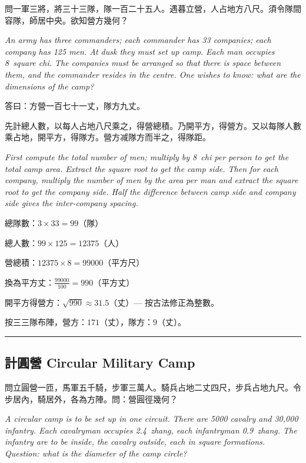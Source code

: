 \documentclass[11pt,a4paper]{article}
\newcommand{\longline}{\noindent\rule{\textwidth}{0.4pt}}
\begin{document}
\begin{problem}
問一軍三將，將三十三隊，隊一百二十五人。遇暮立營，人占地方八尺。須令隊間容隊，師居中央。欲知營方幾何？

\textit{An army has three commanders; each commander has 33 companies; each company has 125 men. At dusk they must set up camp. Each man occupies 8~square chi. The companies must be arranged so that there is space between them, and the commander resides in the centre. One wishes to know: what are the dimensions of the camp?}
\end{problem}

\begin{answer}
答曰：方營一百七十一丈，隊方九丈。
\end{answer}

\begin{method}
先計總人數，以每人占地八尺乘之，得營總積。乃開平方，得營方。又以每隊人數乘占地，開平方，得隊方。營方减隊方而半之，得隊距。

\textit{First compute the total number of men; multiply by 8~chi per person to get the total camp area. Extract the square root to get the camp side. Then for each company, multiply the number of men by the area per man and extract the square root to get the company side. Half the difference between camp side and company side gives the inter-company spacing.}
\end{method}

\begin{working}
總隊數：$3 \times 33 = 99$（隊）

總人數：$99 \times 125 = 12375$（人）

營總積：$12375 \times 8 = 99000$（平方尺）

換為平方丈：$\displaystyle\frac{99000}{100} = 990$（平方丈）

開平方得營方：$\sqrt{990} \approx 31.5$（丈）--- 按古法修正為整數。

按三三隊布陣，營方：$171$（丈），隊方：$9$（丈）。
\end{working}

\vspace{0.5em}
\longline

\subsection{計圓營 \quad Circular Military Camp}

\begin{problem}
問立圓營一匝，馬軍五千騎，步軍三萬人。騎兵占地二丈四尺，步兵占地九尺。令步居內，騎居外，各為方陣。問：營圓徑幾何？

\textit{A circular camp is to be set up in one circuit. There are 5000 cavalry and 30{,}000 infantry. Each cavalryman occupies 2.4~zhang, each infantryman 0.9~zhang. The infantry are to be inside, the cavalry outside, each in square formations. Question: what is the diameter of the camp circle?}
\end{problem}
\end{document}
